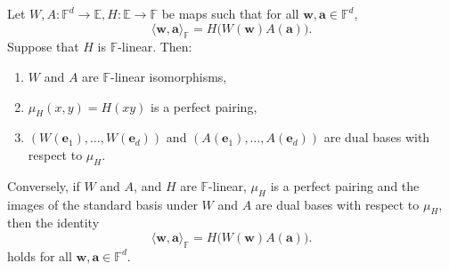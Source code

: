 \documentclass[11pt,letterpaper,usenames,dvipsnames]{article}
\begin{document}
\begin{theorem}
Let $W,A:\mathbb{F}^d\rightarrow\mathbb{E}, H:\mathbb{E}\rightarrow\mathbb{F}$ be maps such that for all
$\mathbf{w},\mathbf{a}\in\mathbb{F}^d$,
\[
\langle \mathbf{w},\mathbf{a}\rangle_{\mathbb{F}}
=
H\bigl(W(\mathbf{w})A(\mathbf{a})\bigr).
\]
Suppose that $H$ is $\mathbb{F}$-linear. Then:
\begin{enumerate}
    \item $W$ and $A$ are $\mathbb{F}$-linear isomorphisms,
    \item $\mu_H(x,y) = H(xy)$ is a perfect pairing,
    \item $\left(W(\mathbf{e}_1),\ldots,W(\mathbf{e}_d)\right)$ and $\left(A(\mathbf{e}_1),\ldots,A(\mathbf{e}_d)\right)$ are dual bases with respect to $\mu_H$.
\end{enumerate}

Conversely, if $W$ and $A$, and $H$ are $\mathbb{F}$-linear, $\mu_H$ is a perfect pairing and the images of the standard basis under $W$ and $A$ are dual bases with respect to $\mu_H$, then the identity
\[
\langle \mathbf{w},\mathbf{a}\rangle_{\mathbb{F}}
=
H\bigl(W(\mathbf{w})A(\mathbf{a})\bigr).
\]
holds for all $\mathbf{w},\mathbf{a}\in\mathbb{F}^d$.
\end{theorem}
\end{document}
